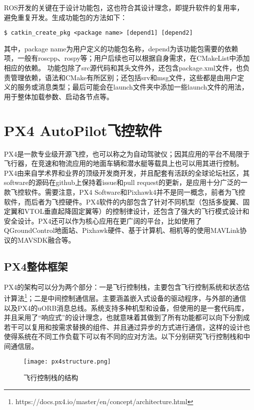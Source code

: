 ROS开发的关键在于设计功能包，这也符合其设计理念，即提升软件的复用率，避免重复开发。生成功能包的方法如下：

\begin{verbatim}
$ catkin_create_pkg <package name> [depend1] [depend2]
\end{verbatim}

其中，package name为用户定义的功能包名称，depend为该功能包需要的依赖项，一般有roscpp、rospy等；用户后续也可以根据自身需求，在CMakeList中添加相应的依赖。
功能包除了src源代码和其头文件外，还包含package.xml文件，也负责管理依赖，语法和CMake有所区别；还包括srv和msg文件，这些都是由用户定义的服务或消息类型；最后可能会在launch文件夹中添加一些launch文件的用法，用于整体加载参数、启动各节点等。


\section{PX4 AutoPilot飞控软件}
PX4是一款专业级开源飞控，也可以称之为自动驾驶仪；因其应用的平台不局限于飞行器，在竞速和物流应用的地面车辆和潜水艇等载具上也可以用其进行控制。PX4由来自学术界和业界的顶级开发商开发，并且配套有活跃的全球论坛社区，其software的源码在github上保持着issue和pull request的更新，是应用十分广泛的一款飞控软件。需要注意，PX4 Software和Pixhawk4并不是同一概念，前者为飞控软件，而后者为飞控硬件。PX4软件的内部包含了针对不同机型（包括多旋翼、固定翼和VTOL垂直起降固定翼等）的控制律设计，还包含了强大的飞行模式设计和安全设计。PX4还可以作为核心应用在更广阔的平台，比如使用了QGroundControl地面站、Pixhawk硬件、基于计算机、相机等的使用MAVLink协议的MAVSDK融合等\cite{meier2015px4}。

\subsection{PX4整体框架}

PX4的架构可以分为两个部分：一是飞行控制栈，主要包含飞行控制系统和状态估计算法\footnote{https://docs.px4.io/master/en/concept/architecture.html}；二是中间控制通信层。主要涵盖嵌入式设备的驱动程序，与外部的通信以及PX4的uORB消息总线。系统支持多种机型和设备，但使用的是一套代码库，并且采用了“响应式”的设计理念，也就意味着其做到了所有功能都可以向下分割成若干可以复用和按需求替换的组件、并且通过异步的方式进行通信，这样的设计也使得系统在不同工作负载下可以有不同的应对方法。以下分别研究飞行控制栈和中间通信层。
~\\
\begin{figure}[!ht]
	\centering
	\texttt{[image: px4structure.png]}
	\caption{飞行控制栈的结构} 
	\label{fig-px4structure}
\end{figure}

